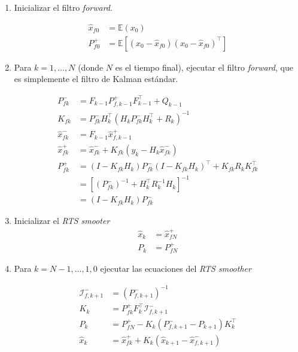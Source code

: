 \begin{enumerate}
    \item Inicializar el filtro \textit{forward}.
    
    \begin{equation}
    \begin{aligned}
    \hat{x}_{f0} &= \mathbb{E}(x_0) \\
    P^{+}_{f0} &= \mathbb{E}\left[(x_0 - \hat{x}_{f0})(x_0 - \hat{x}_{f0})^{\top}\right] 
    \end{aligned}
    \end{equation}
    
    \item Para \(k = 1, \dots, N\) (donde \(N\) es el tiempo final), ejecutar el filtro \textit{forward}, que es simplemente el filtro de Kalman estándar. 
    
    \begin{equation}\label{eq:fordward}
    \begin{aligned}
    P^{-}_{fk} &= F_{k-1}P^{+}_{f,k-1}F_{k-1}^{\top} + Q_{k-1} \\ 
    K_{fk} &= P^{-}_{fk} H_k^{\top} (H_k P^{-}_{fk}H_k^{\top} + R_k)^{-1}  \\
    \hat{x}^{-}_{fk} &= F_{k-1}\hat{x}^{+}_{f,k-1}\\
    \hat{x}^{+}_{fk} &= \hat{x}^{-}_{fk} + K_{fk} \left(y_k - H_k \hat{x}^{-}_{fk} \right)\\ 
    P^{+}_{fk} &= (I - K_{fk}H_k) P^{-}_{fk} (I-K_{fk}H_k)^{\top} + K_{fk}R_{k}K_{fk}^{\top} \\
    &= \left[ (P^{-}_{fk})^{-1} + H_k^{\top} R_{k}^{-1}H_k\right]^{-1} \\ 
    &= (I - K_{fk}H_k)P^{-}_{fk}
    \end{aligned}
    \end{equation}
    
    \item Inicializar el \textit{RTS smooter} 
    \begin{equation}
    \begin{aligned}
    \hat{x}_{k} &= \hat{x}^{+}_{fN} \\
    P_k &= P^{+}_{fN}
    \end{aligned}
    \end{equation}
    
    \item Para \(k = N-1, \dots, 1, 0\) ejecutar las ecuaciones del \textit{RTS smoother} 
    
    \begin{equation}\label{eq:backward}
    \begin{aligned}
    \mathcal{I}^{-}_{f, k+1} &= \left( P^{-}_{f, k+1}\right)^{-1} \\
    K_k &= P^{+}_{fk} F_{k}^{\top} \mathcal{I}^{-}_{f, k+1} \\
    P_k &= P^{+}_{fN} - K_k (P^{-}_{f, k+1} - P_{k+1})K_k^{\top} \\ 
    \hat{x}_k &= \hat{x}^{+}_{fk} + K_k(\hat{x}_{k+1} - \hat{x}^{-}_{f,k+1})
    \end{aligned}
    \end{equation}
\end{enumerate}
